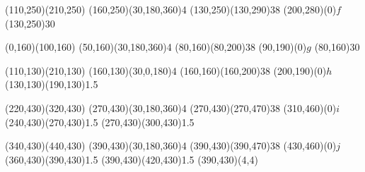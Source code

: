 \documentclass[a4paper]{article}
\begin{document}
\begin{center}
\begin{axopicture}
        \Line[arrow,arrowpos=0.5,arrowlength=6,arrowwidth=3,arrowinset=0.1](110,250)(210,250)
        \DashArc(160,250)(30,180,360){4}
        \Photon(130,250)(130,290){3}{8}
        \Text(200,280)(0){$f$}
        \GCirc(130,250){3}{0}

        \Line[arrow,arrowpos=0.5,arrowlength=6,arrowwidth=3,arrowinset=0.1](0,160)(100,160)
        \DashArc(50,160)(30,180,360){4}
        \Photon(80,160)(80,200){3}{8}
        \Text(90,190)(0){$g$}
        \GCirc(80,160){3}{0}

        \Line[arrow,arrowpos=0.5,arrowlength=6,arrowwidth=3,arrowinset=0.1](110,130)(210,130)
        \DashArc(160,130)(30,0,180){4}
        \Photon(160,160)(160,200){3}{8}
        \Text(200,190)(0){$h$}
        \DoubleLine[arrow,arrowpos=0.5,arrowlength=6,arrowwidth=3,arrowinset=0.1](130,130)(190,130){1.5}

        \Line[](220,430)(320,430)
        \DashArc(270,430)(30,180,360){4}
        \Photon(270,430)(270,470){3}{8}
        \Text(310,460)(0){$i$}
        \DoubleLine[arrow,arrowpos=0.5,arrowlength=6,arrowwidth=3,arrowinset=0.1](240,430)(270,430){1.5}
        \DoubleLine[arrow,arrowpos=0.5,arrowlength=6,arrowwidth=3,arrowinset=0.1](270,430)(300,430){1.5}

        \Line[](340,430)(440,430)
        \DashArc(390,430)(30,180,360){4}
        \Photon(390,430)(390,470){3}{8}
        \Text(430,460)(0){$j$}
        \DoubleLine[arrow,arrowpos=0.5,arrowlength=6,arrowwidth=3,arrowinset=0.1](360,430)(390,430){1.5}
        \DoubleLine[arrow,arrowpos=0.5,arrowlength=6,arrowwidth=3,arrowinset=0.1](390,430)(420,430){1.5}
         \BBoxc(390,430)(4,4)


\end{axopicture}
\end{center}
\end{document}
